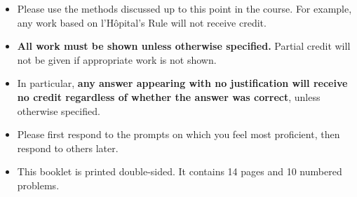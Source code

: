 \documentclass[11pt]{article}
\begin{document}
{\begin{itemize}
    \item Please use the methods discussed up to this point in the course. For example, any work based on l'H\^opital's Rule will not receive credit.
    \item \textbf{All work must be shown unless otherwise specified.} Partial credit will not be given if appropriate work is not shown.
    \item In particular, {\bf any answer appearing with no justification will receive no credit regardless of whether the answer was correct}, unless otherwise specified.
    \item Please first respond to the prompts on which you feel most proficient, then respond to others later.
    \item This booklet is printed double-sided. It contains 14 pages and 10 numbered problems.
    \end{itemize}
    
    }

\vfill



\newpage%
\end{document}
